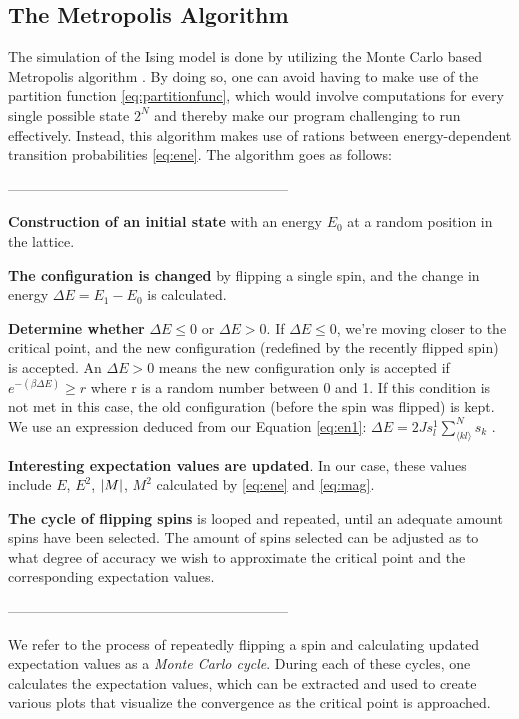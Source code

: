 \documentclass[10pt, nofootinbib, twocolumn]{revtex4-1}
\begin{document}
\subsection{The Metropolis Algorithm}
The simulation of the Ising model is done by utilizing the Monte Carlo based Metropolis algorithm \cite[p.~435]{notes}. By doing so, one can avoid having to make use of the partition function \eqref{eq:partitionfunc}, which would involve computations for every single possible state $2^N$ and thereby make our program challenging to run effectively. Instead, this algorithm makes use of rations between energy-dependent transition probabilities \eqref{eq:ene}. The algorithm goes as follows: 
\begin{center} ------------------------------------------------------------ \end{center}
\begin{description}[]
    \item \textbf{Construction of an initial state} with an energy $E_0$ at a random position in the lattice. 
    \item \textbf{The configuration is changed} by flipping a single spin, and the change in energy $\Delta E=E_1-E_0$ is calculated. 
    \item \textbf{Determine whether} $\Delta E \leq 0$ or $\Delta E>0$. If $\Delta E \leq 0$, we're moving closer to the critical point, and the new configuration (redefined by the recently flipped spin) is accepted. An $\Delta E>0$ means the new configuration only is accepted if $e^{-(\beta \Delta E)} \geq r$ where r is a random number between 0 and 1. If this condition is not met in this case, the old configuration (before the spin was flipped) is kept. We use an expression deduced from our Equation \ref{eq:en1}: $\Delta E = 2Js_l^1 \sum_{\langle kl \rangle}^{N}s_k$ \cite[p.~438]{notes}.
    \item \textbf{Interesting expectation values are updated}. In our case, these values include $E$, $E^2$, $\abs{M}$, $M^2$ calculated by \eqref{eq:ene} and \eqref{eq:mag}. 
    \item \textbf{The cycle of flipping spins} is looped and repeated, until an adequate amount spins have been selected. The amount of spins selected can be adjusted as to what degree of accuracy we wish to approximate the critical point and the corresponding expectation values. 
\end{description}
\begin{center} ------------------------------------------------------------ \end{center}
We refer to the process of repeatedly flipping a spin and calculating updated expectation values as a \textit{Monte Carlo cycle}. During each of these cycles, one calculates the expectation values, which can be extracted and used to create various plots that visualize the convergence as the critical point is approached. 
\end{document}
